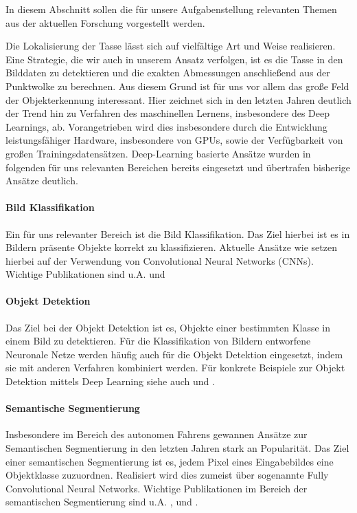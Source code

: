 In diesem Abschnitt sollen die für unsere Aufgabenstellung relevanten Themen aus der aktuellen Forschung vorgestellt werden.

Die Lokalisierung der Tasse lässt sich auf vielfältige Art und Weise realisieren. Eine Strategie, die wir auch in unserem Ansatz verfolgen, ist es die Tasse in den Bilddaten zu detektieren und die exakten Abmessungen anschließend aus der Punktwolke zu berechnen. Aus diesem Grund ist für uns vor allem das große Feld der Objekterkennung interessant. Hier zeichnet sich in den letzten Jahren deutlich der Trend hin zu Verfahren des maschinellen Lernens, insbesondere des Deep Learnings, ab. Vorangetrieben wird dies insbesondere durch die Entwicklung leistungsfähiger Hardware, insbesondere von GPUs, sowie der Verfügbarkeit von großen Trainingsdatensätzen. Deep-Learning basierte Ansätze wurden in folgenden für uns relevanten Bereichen bereits eingesetzt und übertrafen bisherige Ansätze deutlich.

\paragraph{Bild Klassifikation}
Ein für uns relevanter Bereich ist die Bild Klassifikation. Das Ziel hierbei ist es in Bildern präsente Objekte korrekt zu klassifizieren. Aktuelle Ansätze wie setzen hierbei auf der Verwendung von Convolutional Neural Networks (CNNs). Wichtige Publikationen sind u.A. \cite{He.2016} und \cite{Szegedy.20151211}

\paragraph{Objekt Detektion}
Das Ziel bei der Objekt Detektion ist es, Objekte einer bestimmten Klasse in einem Bild zu detektieren. Für die Klassifikation von Bildern entworfene Neuronale Netze werden häufig auch für die Objekt Detektion eingesetzt, indem sie mit anderen Verfahren kombiniert werden. Für konkrete Beispiele zur Objekt Detektion mittels Deep Learning siehe auch \cite{Dai.20160621} und \cite{Ren.2017}. 

\paragraph{Semantische Segmentierung}
Insbesondere im Bereich des autonomen Fahrens gewannen Ansätze zur Semantischen Segmentierung in den letzten Jahren stark an Popularität. Das Ziel einer semantischen Segmentierung ist es, jedem Pixel eines Eingabebildes eine Objektklasse zuzuordnen. Realisiert wird dies zumeist über sogenannte Fully Convolutional Neural Networks. Wichtige Publikationen im Bereich der semantischen Segmentierung sind u.A. \cite{Shelhamer.2017}, \cite{Chen.20170512} und \cite{Badrinarayanan.2017}.

